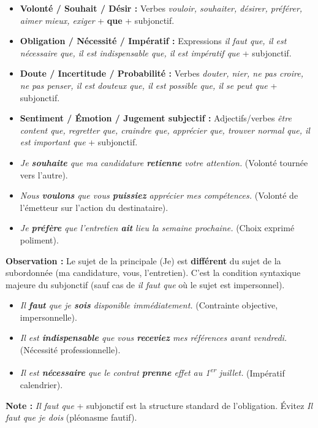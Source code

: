 \documentclass[11pt]{article}
\begin{document}
\begin{propriete}
\begin{itemize}
    \item \textbf{Volonté / Souhait / Désir :} Verbes \emph{vouloir, souhaiter, désirer, préférer, aimer mieux, exiger} + \textbf{que} + subjonctif.
    \item \textbf{Obligation / Nécessité / Impératif :} Expressions \emph{il faut que, il est nécessaire que, il est indispensable que, il est impératif que} + subjonctif.
    \item \textbf{Doute / Incertitude / Probabilité :} Verbes \emph{douter, nier, ne pas croire, ne pas penser, il est douteux que, il est possible que, il se peut que} + subjonctif.
    \item \textbf{Sentiment / Émotion / Jugement subjectif :} Adjectifs/verbes \emph{être content que, regretter que, craindre que, apprécier que, trouver normal que, il est important que} + subjonctif.
\end{itemize}
\end{propriete}

\begin{exemplebox}
\begin{itemize}
    \item \emph{Je \textbf{souhaite} que ma candidature \textbf{retienne} votre attention.} (Volonté tournée vers l'autre).
    \item \emph{Nous \textbf{voulons} que vous \textbf{puissiez} apprécier mes compétences.} (Volonté de l'émetteur sur l'action du destinataire).
    \item \emph{Je \textbf{préfère} que l'entretien \textbf{ait} lieu la semaine prochaine.} (Choix exprimé poliment).
\end{itemize}
\textbf{Observation :} Le sujet de la principale (Je) est \textbf{différent} du sujet de la subordonnée (ma candidature, vous, l'entretien). C'est la condition syntaxique majeure du subjonctif (sauf cas de \emph{il faut que} où le sujet est impersonnel).
\end{exemplebox}

\begin{exemplebox}
\begin{itemize}
    \item \emph{Il \textbf{faut} que je \textbf{sois} disponible immédiatement.} (Contrainte objective, impersonnelle).
    \item \emph{Il est \textbf{indispensable} que vous \textbf{receviez} mes références avant vendredi.} (Nécessité professionnelle).
    \item \emph{Il est \textbf{nécessaire} que le contrat \textbf{prenne} effet au 1\textsuperscript{er} juillet.} (Impératif calendrier).
\end{itemize}
\textbf{Note :} \emph{Il faut que} + subjonctif est la structure standard de l'obligation. Évitez \emph{Il faut que je dois} (pléonasme fautif).
\end{exemplebox}
\end{document}
